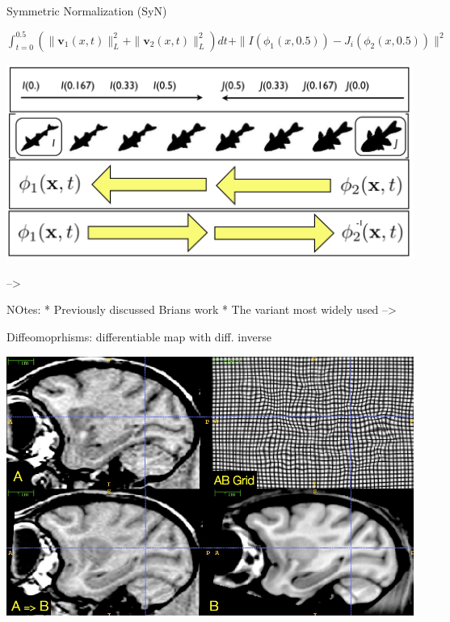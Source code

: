 \documentclass[ignorenonframetext,]{beamer}
\begin{document}
\begin{frame}{Symmetric Normalization (SyN)}

\(\int_{t=0}^{0.5} \left(\|\mathbf{v}_1(x,t)\|_L^2 + \|\mathbf{v}_2(x,t)\|_L^2\right)dt + \|I\left(\phi_1(x,0.5)\right) - J_i\left(\phi_2(x,0.5)\right)\|^2\)

\includegraphics{./papers/figures/fishes.png}

--\textgreater{}

NOtes: * Previously discussed Brians work * The variant most widely used
--\textgreater{}

\end{frame}

\begin{frame}{Diffeomoprhisms: differentiable map with diff. inverse}

\includegraphics{./figures/highresdiffeos.jpg}

\end{frame}
\end{document}
